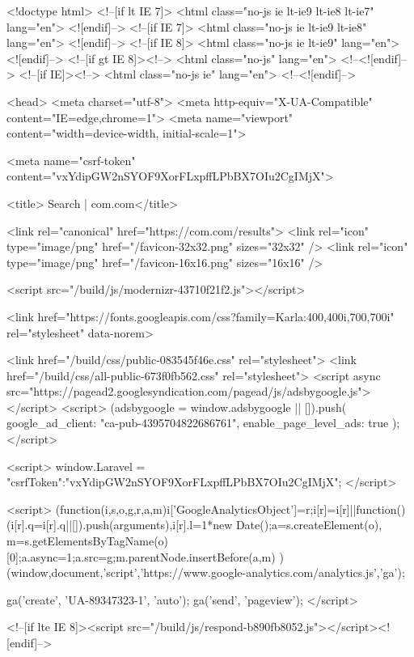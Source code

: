<!doctype html>
<!--[if lt IE 7]>      <html class="no-js ie lt-ie9 lt-ie8 lt-ie7" lang="en"> <![endif]-->
<!--[if IE 7]>         <html class="no-js ie lt-ie9 lt-ie8" lang="en"> <![endif]-->
<!--[if IE 8]>         <html class="no-js ie lt-ie9" lang="en"> <![endif]-->
<!--[if gt IE 8]><!--> <html class="no-js" lang="en"> <!--<![endif]-->
<!--[if IE]><!--> <html class="no-js ie" lang="en"> <!--<![endif]-->

<head>
    <meta charset="utf-8">
    <meta http-equiv="X-UA-Compatible" content="IE=edge,chrome=1">
    <meta name="viewport" content="width=device-width, initial-scale=1">

    
    <meta name="csrf-token" content="vxYdipGW2nSYOF9XorFLxpffLPbBX7OIu2CgIMjX">

    <title>    Search
 | com.com</title>
    
    <link rel="canonical" href="https://com.com/results">
    <link rel="icon" type="image/png" href="/favicon-32x32.png" sizes="32x32" />
    <link rel="icon" type="image/png" href="/favicon-16x16.png" sizes="16x16" />

    
    <script src="/build/js/modernizr-43710f21f2.js"></script>

    <link href="https://fonts.googleapis.com/css?family=Karla:400,400i,700,700i" rel="stylesheet" data-norem>

        <link href="/build/css/public-083545f46e.css" rel="stylesheet">
    <link href="/build/css/all-public-673f0fb562.css" rel="stylesheet">
    <script async src="https://pagead2.googlesyndication.com/pagead/js/adsbygoogle.js"></script>
    <script>
        (adsbygoogle = window.adsbygoogle || []).push({
            google_ad_client: "ca-pub-4395704822686761",
            enable_page_level_ads: true
        });
    </script>
    
    <script>
      window.Laravel = {"csrfToken":"vxYdipGW2nSYOF9XorFLxpffLPbBX7OIu2CgIMjX"};
    </script>

    <script>
        (function(i,s,o,g,r,a,m){i['GoogleAnalyticsObject']=r;i[r]=i[r]||function(){
        (i[r].q=i[r].q||[]).push(arguments)},i[r].l=1*new Date();a=s.createElement(o),
        m=s.getElementsByTagName(o)[0];a.async=1;a.src=g;m.parentNode.insertBefore(a,m)
        })(window,document,'script','https://www.google-analytics.com/analytics.js','ga');

        ga('create', 'UA-89347323-1', 'auto');
        ga('send', 'pageview');
    </script>

    
    <!--[if lte IE 8]><script src="/build/js/respond-b890fb8052.js"></script><![endif]-->

